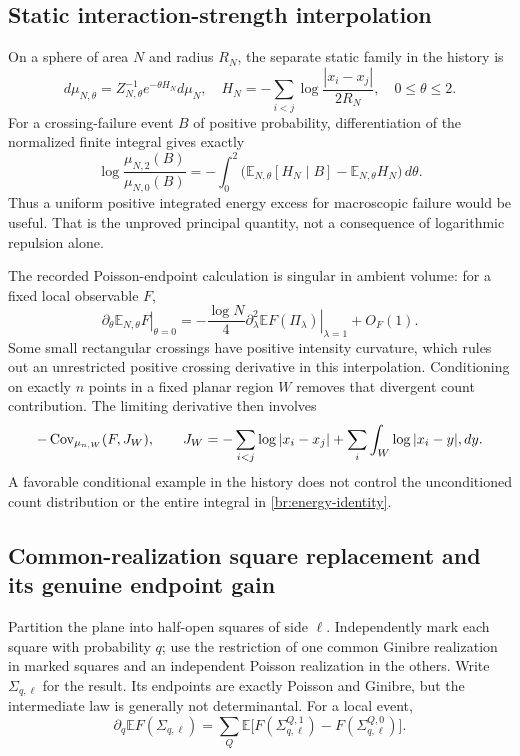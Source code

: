 \documentclass[11pt,a4paper]{article}
\theoremstyle{definition}
\theoremstyle{remark}
\numberwithin{equation}{section}
\begin{document}
\subsection{Static interaction-strength interpolation}
\label{br:energy}

On a sphere of area $N$ and radius $R_N$, the separate static family in
the history is
\[
 d\mu_{N,\theta}=Z_{N,\theta}^{-1}e^{-\theta H_N}d\mu_N,
 \quad
 H_N=-\sum_{i<j}\log\frac{|x_i-x_j|}{2R_N},
 \quad0\leq\theta\leq2.
\]
For a crossing-failure event $B$ of positive probability, differentiation
of the normalized finite integral gives exactly
\begin{equation}
 \log\frac{\mu_{N,2}(B)}{\mu_{N,0}(B)}
 =-\int_0^2
 \bigl(\mathbb E_{N,\theta}[H_N\mid B]
                  -\mathbb E_{N,\theta}H_N\bigr)\,d\theta.
 \label{br:energy-identity}
\end{equation}
Thus a uniform positive integrated energy excess for macroscopic failure
would be useful.  That is the unproved principal quantity, not a
consequence of logarithmic repulsion alone.

The recorded Poisson-endpoint calculation is singular in ambient volume:
for a fixed local observable $F$,
\[
 \left.\partial_\theta\mathbb E_{N,\theta}F\right|_{\theta=0}
 =-\frac{\log N}{4}
   \left.\partial_\lambda^2\mathbb EF(\Pi_\lambda)
   \right|_{\lambda=1}+O_F(1).
\]
Some small rectangular crossings have positive intensity curvature,
which rules out an unrestricted positive crossing derivative in this
interpolation.  Conditioning on exactly $n$ points in a fixed planar
region $W$ removes that divergent count contribution.  The limiting
derivative then involves
\[
 -\operatorname{Cov}_{\mu_{n,W}}(F,J_W),\qquad
 J_W=-\sum_{i<j}\log|x_i-x_j|
       +\sum_i\int_W\log|x_i-y|\\,dy.
\]
A favorable conditional example in the history does not control the
unconditioned count distribution or the entire integral in
\eqref{br:energy-identity}.

\subsection{Common-realization square replacement and its genuine endpoint gain}
\label{br:squares}

Partition the plane into half-open squares of side $\ell$.  Independently
mark each square with probability $q$; use the restriction of one common
Ginibre realization in marked squares and an independent Poisson
realization in the others.  Write $\Sigma_{q,\ell}$ for the result.
Its endpoints are exactly Poisson and Ginibre, but the intermediate law
is generally not determinantal.  For a local event,
\[
 \partial_q\mathbb EF(\Sigma_{q,\ell})
 =\sum_Q\mathbb E\bigl[F(\Sigma^{Q,1}_{q,\ell})
                       -F(\Sigma^{Q,0}_{q,\ell})\bigr].
\]
\end{document}
